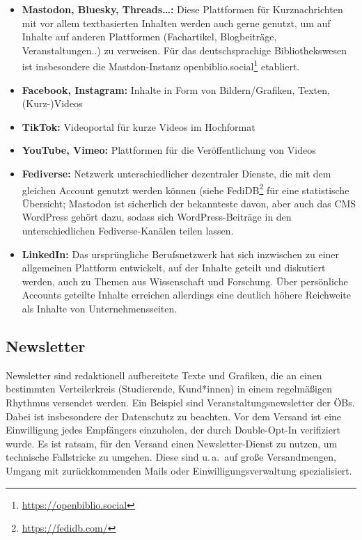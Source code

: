 \documentclass[
  11pt,
  letterpaper,
  DIV=11,
  twoside]{scrreprt}
\DeclareRobustCommand{\href}[2]{#2\footnote{\url{#1}}}
\begin{document}
\begin{itemize}
\item
  \textbf{Mastodon, Bluesky, Threads\ldots:} Diese Plattformen für
  Kurznachrichten mit vor allem textbasierten Inhalten werden auch gerne
  genutzt, um auf Inhalte auf anderen Plattformen (Fachartikel,
  Blogbeiträge, Veranstaltungen..) zu verweisen. Für das
  deutschsprachige Bibliothekswesen ist insbesondere die Mastdon-Instanz
  \href{https://openbiblio.social}{openbiblio.social} etabliert.
\item
  \textbf{Facebook, Instagram:} Inhalte in Form von Bildern/Grafiken,
  Texten, (Kurz-)Videos
\item
  \textbf{TikTok:} Videoportal für kurze Videos im Hochformat
\item
  \textbf{YouTube, Vimeo:} Plattformen für die Veröffentlichung von
  Videos
\item
  \textbf{Fediverse:} Netzwerk unterschiedlicher dezentraler Dienste,
  die mit dem gleichen Account genutzt werden können (siehe
  \href{https://fedidb.com/}{FediDB} für eine statistische Übersicht;
  Mastodon ist sicherlich der bekannteste davon, aber auch das CMS
  WordPress gehört dazu, sodass sich WordPress-Beiträge in den
  unterschiedlichen Fediverse-Kanälen teilen lassen.
\item
  \textbf{LinkedIn:} Das ursprüngliche Berufsnetzwerk hat sich
  inzwischen zu einer allgemeinen Plattform entwickelt, auf der Inhalte
  geteilt und diskutiert werden, auch zu Themen aus Wissenschaft und
  Forschung. Über persönliche Accounts geteilte Inhalte erreichen
  allerdings eine deutlich höhere Reichweite als Inhalte von
  Unternehmensseiten.
\end{itemize}

\subsection{Newsletter}\label{newsletter}

Newsletter sind redaktionell aufbereitete Texte und Grafiken, die an
einen bestimmten Verteilerkreis (Studierende, Kund*innen) in einem
regelmäßigen Rhythmus versendet werden. Ein Beispiel sind
Veranstaltungsnewsletter der ÖBs. Dabei ist insbesondere der Datenschutz
zu beachten. Vor dem Versand ist eine Einwilligung jedes Empfängers
einzuholen, der durch Double-Opt-In verifiziert wurde. Es ist ratsam,
für den Versand einen Newsletter-Dienst zu nutzen, um technische
Fallstricke zu umgehen. Diese sind u.\,a.~auf große Versandmengen,
Umgang mit zurückkommenden Mails oder Einwilligungsverwaltung
spezialisiert.
\end{document}
